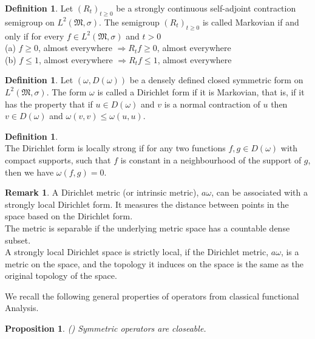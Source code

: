 \documentclass[10pt]{article}
\newtheorem{prop}[thm]{Proposition}
\theoremstyle{definition}
\newtheorem{defx}[thm]{Definition}
\newtheorem{rem}[thm]{Remark}
\numberwithin{equation}{section}
\begin{document}
	
	\begin{defx}
\normalfont
Let $(R_t)_{t\geq 0}$ be a strongly continuous self-adjoint contraction semigroup on $L^2(\mathfrak{M},\sigma)$. The semigroup $(R_t)_{t\geq 0}$ is called Markovian if and only if for every $f\in L^2(\mathfrak{M},\sigma)$ and $t>0$\\
		(a) $f\geq 0$, almost everywhere $\Rightarrow R_tf\geq 0$, almost everywhere\\
		(b) $f\leq 1$, almost everywhere $\Rightarrow R_tf\leq 1$, almost everywhere
	\end{defx}
	\begin{defx}
\normalfont
Let $(\omega,D(\omega))$ be a densely defined closed symmetric form on $L^2(\mathfrak{M},\sigma)$. The form $\omega$ is called a Dirichlet form if it is Markovian, that is, if it has the property that if $u\in D(\omega)$ and $v$ is a normal contraction of $u$ then $v\in D(\omega)$ and $\omega(v,v)\leq \omega(u,u)$.
	\end{defx}
	\begin{defx}
		\normalfont
		\ \\
		The Dirichlet form is locally strong if for any two functions $f,g\in D(\omega)$ with compact supports, such that $f$ is constant in a neighbourhood of the support of $g$, then we have $\omega(f,g)=0$.
		
	\end{defx}
	
	
	\begin{rem}
		\normalfont
A Dirichlet metric (or intrinsic metric), $a\omega$, can be associated with a strongly local Dirichlet form. It measures the distance between points in the space based on the Dirichlet form.\\
		The metric is separable if the underlying metric space has a countable dense subset. \\
		A strongly local Dirichlet space is strictly local, if the Dirichlet metric, $a\omega$, is a metric on the space, and the topology it induces on the space is the same as the original topology of the space.
	\end{rem}
We recall the following general properties of operators from classical functional Analysis.	
\begin{prop}(\cite{Yoshida})
\normalfont
Symmetric operators are closeable.
\end{prop}
	
\end{document}
